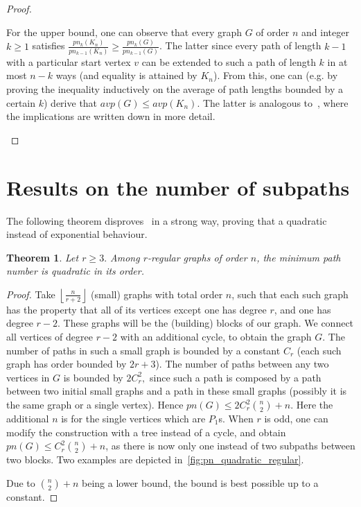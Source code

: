 \documentclass[a4paper,11pt]{article}
\newcommand*{\floorfrac}[2]{\mathopen{}\left\lfloor\frac{#1}{#2}\right\rfloor\mathclose{}}
\newtheorem{thm}[defi]{Theorem}
\newcommand*{\avp}{avp}
\newcommand{\pn}{pn}
\begin{document}
\begin{proof}
\begin{enumerate}
    For the upper bound, one can observe that every graph $G$ of order $n$ and integer $k \ge 1$ satisfies $\frac{\pn_{k}(K_n)}{\pn_{k-1}(K_n)}\ge \frac{\pn_{k}(G)}{\pn_{k-1}(G)}$.
    The latter since every path of length $k-1$ with a particular start vertex $v$ can be extended to such a path of length $k$ in at most $n-k$ ways (and equality is attained by $K_n$).
    From this, one can (e.g. by proving the inequality inductively on the average of path lengths bounded by a certain $k$) derive that $\avp(G) \le \avp(K_n)$. The latter is analogous to~\cite[Sec.~5]{CJW25}, where the implications are written down in more detail.
    \qedhere
    \end{enumerate}
\end{proof}

\section{Results on the number of subpaths}\label{sec:pn}

The following theorem disproves~\cite[Conj.~16]{KSSY25} in a strong way, proving that a quadratic instead of exponential behaviour.

\begin{thm}\label{thm:conj16ontkracht}
    Let $r \ge 3.$
    Among $r$-regular graphs of order $n$, the minimum path number is quadratic in its order.
\end{thm}

\begin{proof}
    Take $\floorfrac{n}{r+2}$ (small) graphs with total order $n$, such that each such graph has the property that all of its vertices except one has degree $r$, and one has degree $r-2.$
    These graphs will be the (building) blocks of our graph.
    We connect all vertices of degree $r-2$ with an additional cycle, to obtain the graph $G$.
    The number of paths in such a small graph is bounded by a constant $C_r$ (each such graph has order bounded by $2r+3$).
    The number of paths between any two vertices in $G$ is bounded by $2C_r^2,$ since such a path is composed by a path between two initial small graphs and a path in these small graphs (possibly it is the same graph or a single vertex). 
    Hence $\pn(G) \le 2C_r^2 \binom{n}{2}+n.$ Here the additional $n$ is for the single vertices which are $P_1$s.
    When $r$ is odd, one can modify the construction with a tree instead of a cycle, and obtain $\pn(G) \le C_r^2 \binom{n}{2}+n$, as there is now only one instead of two subpaths between two blocks.
    Two examples are depicted in~\cref{fig:pn_quadratic_regular}.

    Due to $\binom{n}{2}+n$ being a lower bound, the bound is best possible up to a constant.
\end{proof}
\end{document}
